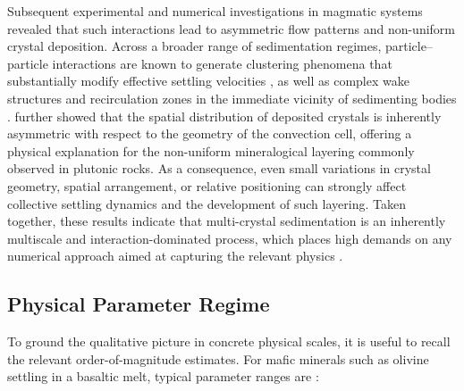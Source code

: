 Subsequent experimental and numerical investigations in magmatic systems \parencite{martin_fluid-dynamical_1989,weinstein_evolution_1988,verhoeven_numerical_2009} revealed that such interactions lead to asymmetric flow patterns and non-uniform crystal deposition. Across a broader range of sedimentation regimes, particle--particle interactions are known to generate clustering phenomena that substantially modify effective settling velocities \parencite{uhlmann_sedimentation_2014,penlou_experimental_2023}, as well as complex wake structures and recirculation zones in the immediate vicinity of sedimenting bodies \parencite{nissanka_dynamics_2023,patocka_settling_2020}. \textcite{weinstein_evolution_1988} further showed that the spatial distribution of deposited crystals is inherently asymmetric with respect to the geometry of the convection cell, offering a physical explanation for the non-uniform mineralogical layering commonly observed in plutonic rocks. As a consequence, even small variations in crystal geometry, spatial arrangement, or relative positioning can strongly affect collective settling dynamics and the development of such layering. Taken together, these results indicate that multi-crystal sedimentation is an inherently multiscale and interaction-dominated process, which places high demands on any numerical approach aimed at capturing the relevant physics \parencite{verhoeven_numerical_2009,uhlmann_sedimentation_2014}.

\subsection{Physical Parameter Regime}

To ground the qualitative picture in concrete physical scales, it is useful to recall the relevant order-of-magnitude estimates. For mafic minerals such as olivine settling in a basaltic melt, typical parameter ranges are \parencite{martin_crystal_1988}:

